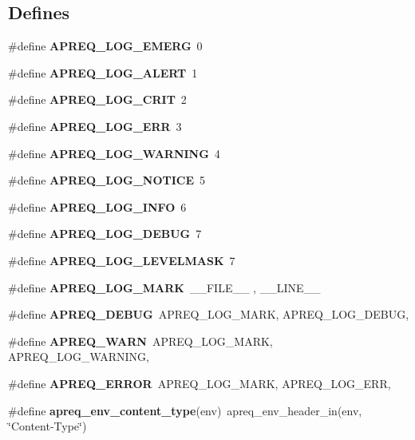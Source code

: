 \subsection*{Defines}
\begin{CompactItemize}
\item 
\#define {\bf APREQ\_\-LOG\_\-EMERG}\ 0\label{apreq__env_8h_a0}

\item 
\#define {\bf APREQ\_\-LOG\_\-ALERT}\ 1\label{apreq__env_8h_a1}

\item 
\#define {\bf APREQ\_\-LOG\_\-CRIT}\ 2\label{apreq__env_8h_a2}

\item 
\#define {\bf APREQ\_\-LOG\_\-ERR}\ 3\label{apreq__env_8h_a3}

\item 
\#define {\bf APREQ\_\-LOG\_\-WARNING}\ 4\label{apreq__env_8h_a4}

\item 
\#define {\bf APREQ\_\-LOG\_\-NOTICE}\ 5\label{apreq__env_8h_a5}

\item 
\#define {\bf APREQ\_\-LOG\_\-INFO}\ 6\label{apreq__env_8h_a6}

\item 
\#define {\bf APREQ\_\-LOG\_\-DEBUG}\ 7\label{apreq__env_8h_a7}

\item 
\#define {\bf APREQ\_\-LOG\_\-LEVELMASK}\ 7\label{apreq__env_8h_a8}

\item 
\#define {\bf APREQ\_\-LOG\_\-MARK}\ \_\-\_\-FILE\_\-\_\- , \_\-\_\-LINE\_\-\_\-\label{apreq__env_8h_a9}

\item 
\#define {\bf APREQ\_\-DEBUG}\ APREQ\_\-LOG\_\-MARK, APREQ\_\-LOG\_\-DEBUG,\label{apreq__env_8h_a10}

\item 
\#define {\bf APREQ\_\-WARN}\ APREQ\_\-LOG\_\-MARK, APREQ\_\-LOG\_\-WARNING,\label{apreq__env_8h_a11}

\item 
\#define {\bf APREQ\_\-ERROR}\ APREQ\_\-LOG\_\-MARK, APREQ\_\-LOG\_\-ERR,\label{apreq__env_8h_a12}

\item 
\#define {\bf apreq\_\-env\_\-content\_\-type}(env)\ apreq\_\-env\_\-header\_\-in(env, \char`\"{}Content-Type\char`\"{})\label{apreq__env_8h_a10}


\end{CompactItemize}
